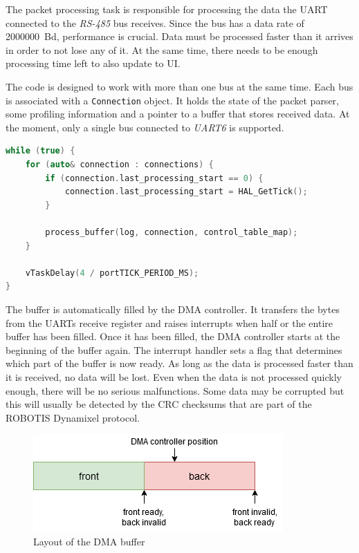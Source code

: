 The packet processing task is responsible for processing the data the UART connected to the \textit{RS-485}
bus receives. Since the bus has a data rate of \SI{2000000}{Bd}, performance is crucial. Data must be
processed faster than it arrives in order to not lose any of it. At the same time, there needs to be
enough processing time left to also update to UI.

The code is designed to work with more than one bus at the same time. Each bus is associated with
a \lstinline{Connection} object. It holds the state of the packet parser, some profiling information
and a pointer to a buffer that stores received data. At the moment, only a single bus connected to
\textit{UART6} is supported.

\begin{lstlisting}[language=C++, caption={Main loop of the packet processing task}]
while (true) {
    for (auto& connection : connections) {
        if (connection.last_processing_start == 0) {
            connection.last_processing_start = HAL_GetTick();
        }

        process_buffer(log, connection, control_table_map);
    }

    vTaskDelay(4 / portTICK_PERIOD_MS);
}
\end{lstlisting}

The buffer is automatically filled by the DMA controller. It transfers the bytes from the UARTs
receive register and raises interrupts when half or the entire buffer has been filled. Once it has
been filled, the DMA controller starts at the beginning of the buffer again. The interrupt handler
sets a flag that determines which part of the buffer is now ready. As long as the data is processed
faster than it is received, no data will be lost. Even when the data is not processed quickly enough,
there will be no serious malfunctions. Some data may be corrupted but this will usually be detected
by the CRC checksums that are part of the ROBOTIS Dynamixel protocol.

\begin{figure}[h]
    \centering
    \includegraphics[scale=0.75]{img/dma_buffer.png}
    \caption{Layout of the DMA buffer}
\end{figure}

